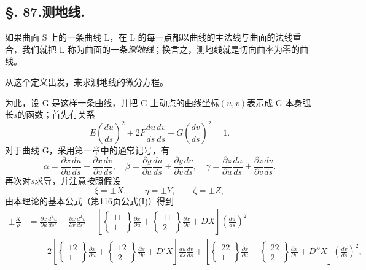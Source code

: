 \subsection*{\S. 87.\quad 测地线.}

如果曲面 S 上的一条曲线 L，在 L 的每一点都以曲线的主法线与曲面的法线重合，我们就把 L 称为曲面的一条\emph{测地线}；换言之，测地线就是切向曲率为零的曲线。

从这个定义出发，来求测地线的微分方程。

为此，设 G 是这样一条曲线，并把 G 上动点的曲线坐标\((u,v)\)表示成 G 本身弧长\(s\)的函数；首先有关系
\begin{equation}\tag{7}
 E\left(\frac{du}{ds}\right)^2+2F\frac{du}{ds}\frac{dv}{ds}+G\left(\frac{dv}{ds}\right)^2=1.
\end{equation}
对于曲线 G，采用第一章中的通常记号，有
\[
 \alpha=\frac{\partial x}{\partial u}\frac{du}{ds}+\frac{\partial x}{\partial v}\frac{dv}{ds},\quad
 \beta=\frac{\partial y}{\partial u}\frac{du}{ds}+\frac{\partial y}{\partial v}\frac{dv}{ds},\quad
 \gamma=\frac{\partial z}{\partial u}\frac{du}{ds}+\frac{\partial z}{\partial v}\frac{dv}{ds}.
\]
再次对\(s\)求导，并注意按照假设
\[
 \xi=\pm X,
 \qquad
 \eta=\pm Y,
 \qquad
 \zeta=\pm Z,
\]
由本理论的基本公式（第116页公式(I)）得到
\[
\begin{aligned}
 \pm\frac{X}{\rho}&=\frac{\partial x}{\partial u}\frac{d^2u}{ds^2}+\frac{\partial x}{\partial v}\frac{d^2v}{ds^2}
+\left[\left\{\begin{matrix}11\\1\end{matrix}\right\}\frac{\partial x}{\partial u}+\left\{\begin{matrix}11\\2\end{matrix}\right\}\frac{\partial x}{\partial v}+DX\right]\left(\frac{du}{ds}\right)^2\\
&\quad+2\left[\left\{\begin{matrix}12\\1\end{matrix}\right\}\frac{\partial x}{\partial u}+\left\{\begin{matrix}12\\2\end{matrix}\right\}\frac{\partial x}{\partial v}+D'X\right]\frac{du}{ds}\frac{dv}{ds}
+\left[\left\{\begin{matrix}22\\1\end{matrix}\right\}\frac{\partial x}{\partial u}+\left\{\begin{matrix}22\\2\end{matrix}\right\}\frac{\partial x}{\partial v}+D''X\right]\left(\frac{dv}{ds}\right)^2,
\end{aligned}
\]
